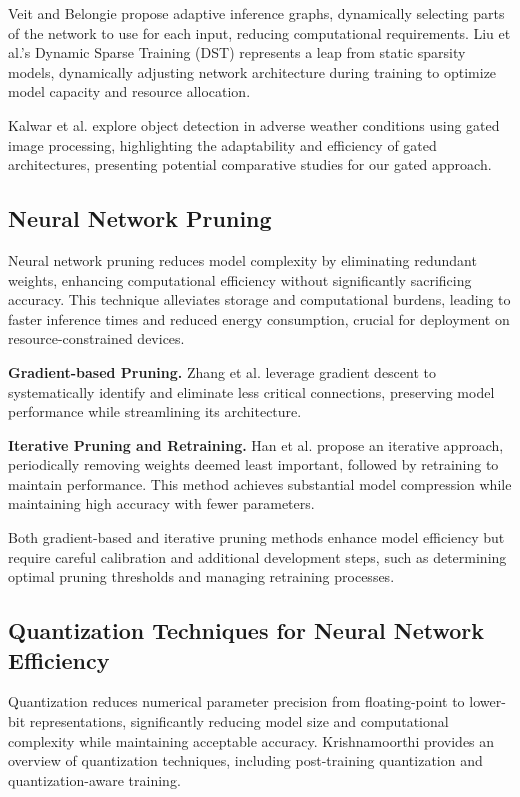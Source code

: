 Veit and Belongie \cite{veit2020convolutional} propose adaptive inference graphs, dynamically selecting parts of the network to use for each input, reducing computational requirements. Liu et al.'s Dynamic Sparse Training (DST) \cite{liu2020dynamic} represents a leap from static sparsity models, dynamically adjusting network architecture during training to optimize model capacity and resource allocation.

Kalwar et al. \cite{kalwar2023gdip} explore object detection in adverse weather conditions using gated image processing, highlighting the adaptability and efficiency of gated architectures, presenting potential comparative studies for our gated approach.

\subsection{Neural Network Pruning}

Neural network pruning reduces model complexity by eliminating redundant weights, enhancing computational efficiency without significantly sacrificing accuracy. This technique alleviates storage and computational burdens, leading to faster inference times and reduced energy consumption, crucial for deployment on resource-constrained devices.

\textbf{Gradient-based Pruning.} Zhang et al. \cite{zhang2023neural} leverage gradient descent to systematically identify and eliminate less critical connections, preserving model performance while streamlining its architecture.

\textbf{Iterative Pruning and Retraining.} Han et al. \cite{han2016deep} propose an iterative approach, periodically removing weights deemed least important, followed by retraining to maintain performance. This method achieves substantial model compression while maintaining high accuracy with fewer parameters.

Both gradient-based and iterative pruning methods enhance model efficiency but require careful calibration and additional development steps, such as determining optimal pruning thresholds and managing retraining processes.

\subsection{Quantization Techniques for Neural Network Efficiency}

Quantization reduces numerical parameter precision from floating-point to lower-bit representations, significantly reducing model size and computational complexity while maintaining acceptable accuracy. Krishnamoorthi \cite{krishnamoorthi2018quantizing} provides an overview of quantization techniques, including post-training quantization and quantization-aware training.


